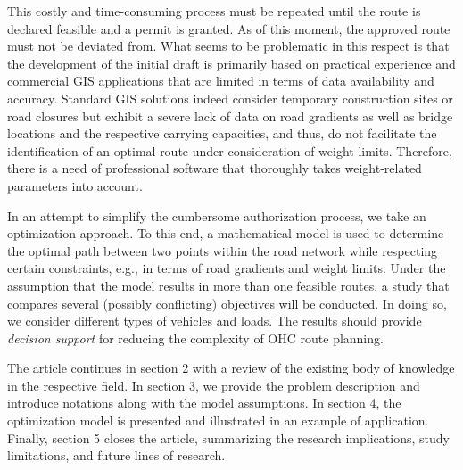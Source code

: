 This costly and time-consuming process must be repeated until the route is declared feasible and a permit is granted. As of this moment, the approved route must not be deviated from.
What seems to be problematic in this respect is that the development of the initial draft is primarily based on practical experience and commercial GIS applications that are limited in terms of data availability and accuracy.
Standard GIS solutions indeed consider temporary construction sites or road closures but exhibit a severe lack of data on road gradients as well as bridge locations and the respective carrying capacities, and thus, do not facilitate the identification of an optimal route under consideration of weight limits.
Therefore, there is a need of professional software that thoroughly takes weight-related parameters into account.
\par In an attempt to simplify the cumbersome authorization process, we take an optimization approach.
To this end, a mathematical model is used to determine the optimal path between two points within the road network while respecting certain constraints, e.g., in terms of road gradients and weight limits.
Under the assumption that the model results in more than one feasible routes, a study that compares several (possibly conflicting) objectives will be conducted.
In doing so, we consider different types of vehicles and loads. The results should provide \textit{decision support} for reducing the complexity of OHC route planning. 
\par
The article continues in section 2 with a review of the existing body of knowledge in the respective field.
In section 3, we provide the problem description and introduce notations along with the model assumptions. In section 4, the optimization model is presented and illustrated in an example of application.
Finally, section 5 closes the article, summarizing the research implications, study limitations, and future lines of research.

